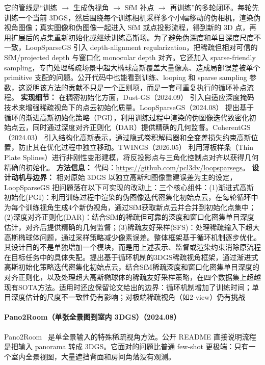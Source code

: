 它的管线是“训练 $\rightarrow$ 生成伪视角 $\rightarrow$ SfM 补点 $\rightarrow$ 再训练”的多轮闭环。每轮先训练一个当前 3DGS，然后围绕每个训练相机采样多个小幅移动的伪相机，渲染伪视角图像；真实图像和伪图像一起进入 SfM 或点投影流程，得到新的 3D 点，再用扩展后的点集重新初始化或继续训练高斯场。为了避免伪深度和单目深度尺度不一致，LoopSparseGS 引入 depth-alignment regularization，把稀疏但相对可信的 SfM/projected depth 与窗口化 monocular depth 对齐。它还加入 sparse-friendly sampling，专门处理稀疏场景中超大椭球高斯覆盖大量像素、造成局部误差被单个 primitive 支配的问题。公开代码中也能看到训练、looping 和 sparse sampling 参数，这说明该方法的贡献不只是一个正则项，而是一套可重复执行的循环补点流程。
\textbf{实现细节：} 在稠密初始化方面，Dust-GS（2024.09） 引入自适应深度掩码技术来增强稀疏视角下的点云初始化质量。LoopSparseGS（2024.08） 提出基于循环的渐进高斯初始化策略（PGI），利用训练过程中渲染的伪图像迭代致密化初始点云，同时通过深度对齐正则化（DAR）提供精确的几何监督。CoherentGS（2024.03） 引入结构化高斯表示，通过隐式卷积解码器和全变差损失约束高斯位置，防止其在优化过程中独立移动。TWINGS（2026.05） 利用薄板样条（Thin Plate Splines）进行非刚性变形建模，将反投影点与三角化控制点对齐以获得几何精确的初始化。
\textbf{方法信息：} 代码：\url{https://github.com/pcl3dv/loopsparsegs}。
\textbf{设计动机与边界：} 相对原始 3DGS 以独立高斯和图像重建误差为主的设定，LoopSparseGS 把问题落在以下可实现的改动上：三个核心组件：(1)渐进式高斯初始化(PGI)：利用训练过程中渲染的伪图像迭代密集化初始点云，在每轮循环中为每个训练视角生成4个新伪视角，通过SfM获取新点云并合并到初始化点集中；(2)深度对齐正则化(DAR)：结合SfM的稀疏但可靠的深度和窗口化密集单目深度估计，对齐后提供精确的几何监督；(3)稀疏友好采样(SFS)：处理稀疏输入下超大高斯椭球体问题，通过采样策略减少像素误差。整体框架基于循环机制逐步优化。其设计目的不是单独增加一个模块，而是用上述表示、监督或渲染约束消除原流程在目标任务中的具体失配。提出基于循环机制的3DGS稀疏视角框架，通过渐进式高斯初始化策略迭代密集化初始点云，结合SfM稀疏深度和窗口化密集单目深度的对齐正则化，以及处理超大高斯椭球体的稀疏友好采样策略，在四个数据集上超越现有SOTA方法。适用时还应保留论文给出的边界：循环机制增加了训练时间；单目深度估计的尺度不一致性仍有影响；对极端稀疏视角（如2-view）仍有挑战
\paragraph{Pano2Room（单张全景图到室内 3DGS）（2024.08）}
Pano2Room~\cite{2408_11413} 是单全景输入的特殊稀疏视角方法。公开 README 直接说明流程是把输入 panorama 转成 3DGS。它面对的问题比普通 few-shot 更极端：只有一个室内全景视图，大量遮挡背面和房间角落没有观测。

